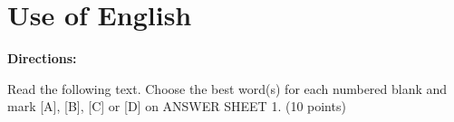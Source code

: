 
\section{Use of English}

\textbf{Directions:}

Read the following text. Choose the best word(s) for each numbered blank and mark [A], [B], [C] or [D] on ANSWER SHEET 1. (10 points)

\vspace{6pt}